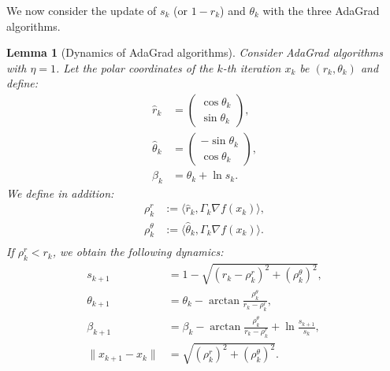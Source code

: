 \documentclass{article}
\theoremstyle{plain}
\newtheorem{lemma}[theorem]{Lemma}
\theoremstyle{definition}
\theoremstyle{remark}
\newcommand{\innp}[2]{\langle #1, #2 \rangle}
\begin{document}
We now consider the update of $s_k$ (or $1 - r_k$) and $\theta_k$ with the three AdaGrad algorithms. 

\begin{lemma}[Dynamics of AdaGrad algorithms]
    \label{lemma:dynamics-adagrad-algos}
    Consider AdaGrad algorithms with $\eta = 1$. Let the polar coordinates of the $k$-th iteration $x_k$ be $(r_k, \theta_k)$ and define: 
    \begin{equation*}
        \begin{aligned}
            \hat{r}_k &= \begin{pmatrix}
                \cos\theta_k \\ \sin\theta_k
            \end{pmatrix}, \\
            \hat{\theta}_k &= \begin{pmatrix}
                -\sin\theta_k \\ \cos\theta_k
            \end{pmatrix},\\
            \beta_k &= \theta_k + \ln s_k.
        \end{aligned}
    \end{equation*}
    We define in addition:
    \begin{equation*}
        \begin{aligned}
            \rho_{k}^r &:= \innp{\hat{r}_k}{\Gamma_k\nabla f(x_k)},\\
            \rho_{k}^\theta &:= \innp{\hat{\theta}_k}{\Gamma_k\nabla f(x_k)}.\\
        \end{aligned}
    \end{equation*}
    If $\rho_k^r < r_k$, we obtain the following dynamics: 
    \begin{equation}
        \label{eq:dynamics-s-beta}
        \begin{aligned}
            s_{k + 1} &= 1 - \sqrt{(r_k - \rho_k^r)^2 + (\rho_k^\theta)^2},\\
            \theta_{k+1} &= \theta_k - \arctan \frac{\rho_k^\theta}{r_k - \rho^r_k},\\
            \beta_{k + 1} &= \beta_k - \arctan \frac{\rho_k^\theta}{r_k - \rho^r_k} + \ln \frac{s_{k+1}}{s_{k}},\\
            \|x_{k + 1} - x_k\| &= \sqrt{(\rho_k^r)^2 + (\rho_k^\theta)^2}.
        \end{aligned}
    \end{equation}
\end{lemma}
\end{document}
